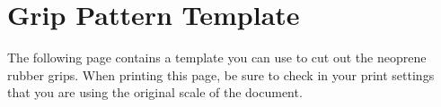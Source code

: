 
\chapter{Grip Pattern Template} %

\label{AppendixB}

The following page contains a template you can use to cut out the neoprene rubber grips. When printing this page, be sure to check in your print settings that you are using the original scale of the document.
